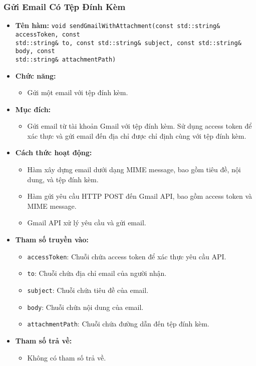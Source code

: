 \subsubsection{Gửi Email Có Tệp Đính Kèm}
\begin{itemize}
    \item \textbf{Tên hàm:} \texttt{void sendGmailWithAttachment(const std::string\& accessToken, const \\std::string\& to, const std::string\& subject, const std::string\& body, const \\std::string\& attachmentPath)}
    \item \textbf{Chức năng:} 
    \begin{itemize}
        \item Gửi một email với tệp đính kèm.
    \end{itemize}
    \item \textbf{Mục đích:} 
    \begin{itemize}
        \item Gửi email từ tài khoản Gmail với tệp đính kèm. Sử dụng access token để xác thực và gửi email đến địa chỉ được chỉ định cùng với tệp đính kèm.
    \end{itemize}
    \item \textbf{Cách thức hoạt động:} 
    \begin{itemize}
        \item Hàm xây dựng email dưới dạng MIME message, bao gồm tiêu đề, nội dung, và tệp đính kèm.
        \item Hàm gửi yêu cầu HTTP POST đến Gmail API, bao gồm access token và MIME message.
        \item Gmail API xử lý yêu cầu và gửi email.
    \end{itemize}
    \item \textbf{Tham số truyền vào:} 
    \begin{itemize}
        \item \texttt{accessToken}: Chuỗi chứa access token để xác thực yêu cầu API.
        \item \texttt{to}: Chuỗi chứa địa chỉ email của người nhận.
        \item \texttt{subject}: Chuỗi chứa tiêu đề của email.
        \item \texttt{body}: Chuỗi chứa nội dung của email.
        \item \texttt{attachmentPath}: Chuỗi chứa đường dẫn đến tệp đính kèm.
    \end{itemize}
    \item \textbf{Tham số trả về:} 
    \begin{itemize}
        \item Không có tham số trả về.
    \end{itemize}
\end{itemize}

